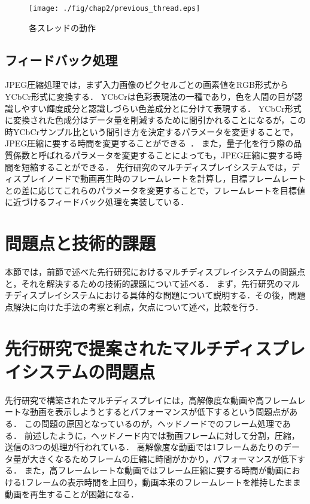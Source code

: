   \begin{center}
    \begin{figure}[H]
        \hspace*{\fill}
        \texttt{[image: ./fig/chap2/previous\_thread.eps]}
        \hspace*{\fill}
        \caption{各スレッドの動作}
    \end{figure}
    \end{center}
   

\subsection*{フィードバック処理}

JPEG圧縮処理では，まず入力画像のピクセルごとの画素値をRGB形式からYCbCr形式に変換する．
YCbCrは色彩表現法の一種であり，色を人間の目が認識しやすい輝度成分と認識しづらい色差成分とに分けて表現する\cite{YCbCr}．
YCbCr形式に変換された色成分はデータ量を削減するために間引かれることになるが，この時YCbCrサンプル比という間引き方を決定するパラメータを変更することで，
JPEG圧縮に要する時間を変更することができる~\cite{jpeg2}．
また，量子化を行う際の品質係数と呼ばれるパラメータを変更することによっても，JPEG圧縮に要する時間を短縮することができる．
先行研究のマルチディスプレイシステムでは，ディスプレイノードで動画再生時のフレームレートを計算し，目標フレームレートとの差に応じてこれらのパラメータを変更することで，フレームレートを目標値に近づけるフィードバック処理を実装している．





\section*{問題点と技術的課題}

本節では，前節で述べた先行研究におけるマルチディスプレイシステムの問題点と，それを解決するための技術的課題について述べる．
まず，先行研究のマルチディスプレイシステムにおける具体的な問題について説明する．その後，問題点解決に向けた手法の考察と利点，欠点について述べ，比較を行う．

\section*{先行研究で提案されたマルチディスプレイシステムの問題点}
先行研究で構築されたマルチディスプレイには，高解像度な動画や高フレームレートな動画を表示しようとするとパフォーマンスが低下するという問題点がある．
この問題の原因となっているのが，ヘッドノードでのフレーム処理である．
前述したように，ヘッドノード内では動画フレームに対して分割，圧縮，送信の3つの処理が行われている．
高解像度な動画では1フレームあたりのデータ量が大きくなるためフレームの圧縮に時間がかかり，パフォーマンスが低下する．
また，高フレームレートな動画ではフレーム圧縮に要する時間が動画における1フレームの表示時間を上回り，動画本来のフレームレートを維持したまま動画を再生することが困難になる．

